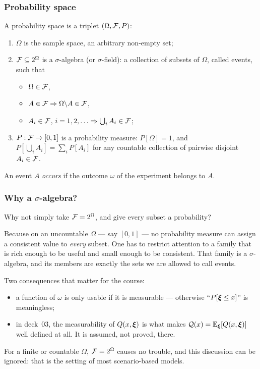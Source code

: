 \documentclass[aspectratio=169]{beamer}
\begin{document}
\begin{frame}
\frametitle{Probability space}

A {\red probability space} is a triplet $(\Omega, {\mathcal{F}}, P)$:
\begin{enumerate}
\item
$\Omega$ is the {\red sample space}, an arbitrary non-empty set;
\item
${\mathcal{F}} \subseteq 2^{\Omega}$ is a {\red $\sigma$-algebra} (or $\sigma$-field): a collection of subsets of $\Omega$, called {\red events}, such that
\begin{itemize}
	\item $\Omega \in {\mathcal{F}}$,
	\item $A \in {\mathcal{F}} \Rightarrow \Omega \backslash A \in {\mathcal{F}}$,
	\item $A_i \in {\mathcal{F}}$, $i = 1, 2, \ldots \Rightarrow \bigcup_i A_i \in {\mathcal{F}}$;
\end{itemize}
\item
$P: {\mathcal{F}} \rightarrow [0,1]$ is a {\red probability measure}: $P[\Omega] = 1$, and
$P\left[\bigcup_i A_i\right] = \sum_i P[A_i]$ for any countable collection of pairwise disjoint $A_i \in {\mathcal{F}}$.
\end{enumerate}

\mbox{}

An event $A$ {\it occurs} if the outcome $\omega$ of the experiment belongs to $A$.

\end{frame}

\begin{frame}
\frametitle{Why a $\sigma$-algebra?}

Why not simply take ${\mathcal{F}} = 2^{\Omega}$, and give every subset a probability?

\mbox{}

Because on an uncountable $\Omega$ --- say $[0,1]$ --- no probability measure can assign a consistent value to {\it every} subset. One has to restrict attention to a family that is rich enough to be useful and small enough to be consistent. That family is a $\sigma$-algebra, and its members are exactly the sets we are allowed to call events.

\mbox{}

Two consequences that matter for the course:
\begin{itemize}
\item
a function of $\omega$ is only usable if it is {\red measurable} --- otherwise ``$P[{\boldsymbol{\xi}} \leq x]$'' is meaningless;
\item
in deck~03, the measurability of $Q(x,{\boldsymbol{\xi}})$ is what makes ${\mathcal{Q}}(x) = {\mathbb{E}}_{{\boldsymbol{\xi}}}[Q(x,{\boldsymbol{\xi}})]$ well defined at all. It is assumed, not proved, there.
\end{itemize}

\mbox{}

For a finite or countable $\Omega$, ${\mathcal{F}} = 2^{\Omega}$ causes no trouble, and this discussion can be ignored: that is the setting of most scenario-based models.

\end{frame}
\end{document}
